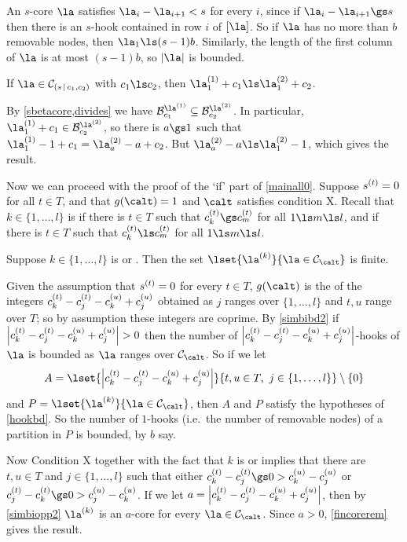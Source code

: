 \documentclass[a4paper, 11pt, twoside]{article}
\begin{document}
\begin{pf}
An $s$-core $\la$ satisfies $\la_i-\la_{i+1}<s$ for every $i$, since if $\la_i-\la_{i+1}\gs s$ then there is an $s$-hook contained in row $i$ of $[\la]$. So if $\la$ has no more than $b$ removable nodes, then $\la_1\ls(s-1)b$. Similarly, the length of the first column of $\la$ is at most $(s-1)b$, so $|\la|$ is bounded.
\end{pf}

\begin{lemma}\label{lengthmc}
If $\la\in\mc s{c_1,c_2}$ with $c_1\ls c_2$, then $\cpt\la1_1+c_1\ls\cpt\la2_1+c_2$.
\end{lemma}

\begin{pf}
By \cref{sbetacore,divides} we have $\ber{\cpt\la1}{c_1}\subseteq\ber{\cpt\la2}{c_2}$. In particular, $\cpt\la1_1+c_1\in\ber{\cpt\la2}{c_2}$, so there is $a\gs1$ such that $\cpt\la1_1-1+c_1=\cpt\la2_a-a+c_2$. But $\cpt\la2_a-a\ls\cpt\la2_1-1$, which gives the result. 
\end{pf}

Now we can proceed with the proof of the `if' part of \cref{mainall0}. Suppose $s^{(t)}=0$ for all $t\in T$, and that $g(\calt)=1$ and $\calt$ satisfies condition X. Recall that $k\in\{1,\dots,l\}$ is \emph{\smx} if there is $t\in T$ such that $\sof ct_k\gs\sof ct_m$ for all $1\ls m\ls l$, and \emph{\smn} if there is $t\in T$ such that $\sof ct_k\ls\sof ct_m$ for all $1\ls m\ls l$.

\begin{lemma}\label{sometimesmx}
Suppose $k\in\{1,\dots,l\}$ is \smx or \smn. Then the set $\lset{\cpt\la k}{\la\in\smc\calt}$ is finite.
\end{lemma}

\begin{pf}
Given the assumption that $s^{(t)}=0$ for every $t\in T$, $g(\calt)$ is the \gcd of the integers $c^{(t)}_k-c^{(t)}_j-c^{(u)}_k+c^{(u)}_j$ obtained as $j$ ranges over $\{1,\dots,l\}$ and $t,u$ range over $T$; so by assumption these integers are coprime. By \cref{simbibd2} if $\left|\sof ct_k-\sof ct_j-\sof cu_k+\sof cu_j\right|>0$ then the number of $\left|c^{(t)}_k-c^{(t)}_j-c^{(u)}_k+c^{(u)}_j\right|$-hooks of $\la$ is bounded as $\la$ ranges over $\smc\calt$. So if we let
\[
A=\lset{\left|\sof ct_k-\sof ct_j-\sof cu_k+\sof cu_j\right|}{t,u\in T,\ j\in\{1,\dots,l\}}\setminus\{0\}
\]
and $P=\lset{\cpt\la k}{\la\in\smc\calt}$, then $A$ and $P$ satisfy the hypotheses of \cref{hookbd}. So the number of $1$-hooks (i.e.\ the number of removable nodes) of a partition in $P$ is bounded, by $b$ say.

Now Condition X together with the fact that $k$ is \smx or \smn implies that there are $t,u\in T$ and $j\in\{1,\dots,l\}$ such that either $\sof ct_k-\sof ct_j\gs0>\sof cu_k-\sof cu_j$ or $\sof ct_j-\sof ct_k\gs0>\sof cu_j-\sof cu_k$. If we let $a=\left|c^{(t)}_k-c^{(t)}_j-c^{(u)}_k+c^{(u)}_j\right|$, then by \cref{simbiopp2} $\cpt\la k$ is an $a$-core for every $\la\in\smc\calt$. Since $a>0$, \cref{fincorerem} gives the result.
\end{pf}
\end{document}
